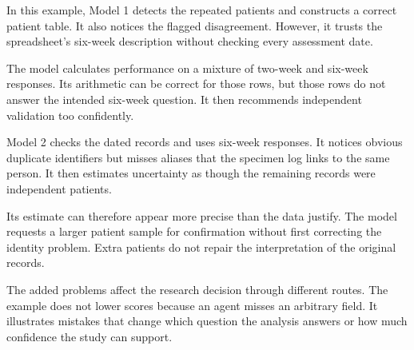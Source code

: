 In this example, Model 1 detects the repeated patients and constructs a correct patient table. It also notices the flagged disagreement. However, it trusts the spreadsheet's six-week description without checking every assessment date.

The model calculates performance on a mixture of two-week and six-week responses. Its arithmetic can be correct for those rows, but those rows do not answer the intended six-week question. It then recommends independent validation too confidently.

Model 2 checks the dated records and uses six-week responses. It notices obvious duplicate identifiers but misses aliases that the specimen log links to the same person. It then estimates uncertainty as though the remaining records were independent patients.

Its estimate can therefore appear more precise than the data justify. The model requests a larger patient sample for confirmation without first correcting the identity problem. Extra patients do not repair the interpretation of the original records.

\newpage
{}

The added problems affect the research decision through different routes. The example does not lower scores because an agent misses an arbitrary field. It illustrates mistakes that change which question the analysis answers or how much confidence the study can support.

\begin{center}
\end{center}

